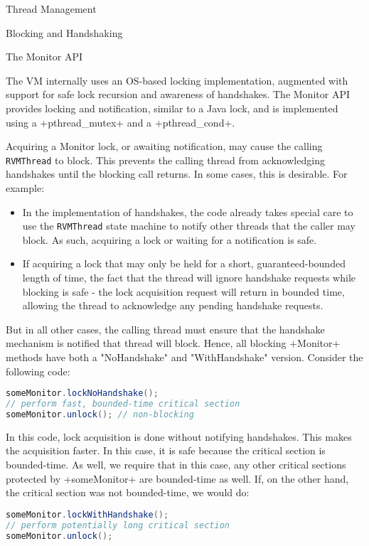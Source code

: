\begin{section}{Thread Management}
\begin{subsection}{Blocking and Handshaking}
\end{subsection}

\begin{subsection}{The Monitor API}

The VM internally uses an OS-based locking implementation, augmented with support for safe lock recursion and awareness of handshakes. The Monitor API provides locking and notification, similar to a Java lock, and is implemented using a \spverb+pthread_mutex+ and a \spverb+pthread_cond+.

Acquiring a Monitor lock, or awaiting notification, may cause the calling \texttt{RVM\-Thread} to block. This prevents the calling thread from acknowledging handshakes until the blocking call returns. In some cases, this is desirable. For example:
\begin{itemize}
  \item In the implementation of handshakes, the code already takes special care to use the \texttt{RVM\-Thread} state machine to notify other threads that the caller may block. As such, acquiring a lock or waiting for a notification is safe.
  \item If acquiring a lock that may only be held for a short, guaranteed-bounded length of time, the fact that the thread will ignore handshake requests while blocking is safe - the lock acquisition request will return in bounded time, allowing the thread to acknowledge any pending handshake requests.
\end{itemize}

But in all other cases, the calling thread must ensure that the handshake mechanism is notified that thread will block. Hence, all blocking \spverb+Monitor+ methods have both a "NoHandshake" and "WithHandshake" version. Consider the following code:

\begin{lstlisting}[language=Java]
someMonitor.lockNoHandshake();
// perform fast, bounded-time critical section
someMonitor.unlock(); // non-blocking
\end{lstlisting}

In this code, lock acquisition is done without notifying handshakes. This makes the acquisition faster. In this case, it is safe because the critical section is bounded-time. As well, we require that in this case, any other critical sections protected by \spverb+someMonitor+ are bounded-time as well. If, on the other hand, the critical section was not bounded-time, we would do:

\begin{lstlisting}[language=Java]
someMonitor.lockWithHandshake();
// perform potentially long critical section
someMonitor.unlock();
\end{lstlisting}


\end{subsection}
\end{section}
